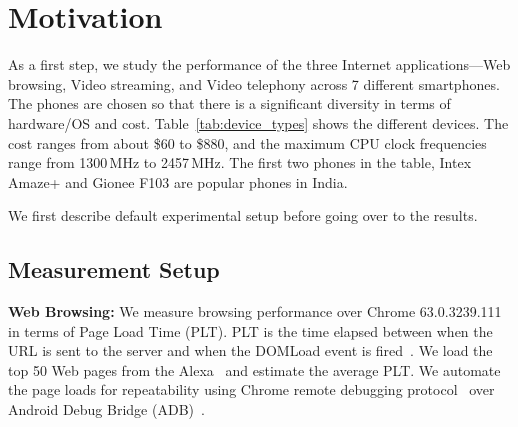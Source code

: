 
\section{Motivation} 
\label{sec:motivation}

As a first step, we study the performance of the three Internet applications---Web browsing, Video streaming, and Video telephony across 7  different smartphones. 
The phones are chosen so that there is a significant
diversity in terms of hardware/OS and cost. Table~\ref{tab:device_types} shows the different devices. The cost ranges from  about \$60 to \$880, and the maximum CPU clock frequencies range from 1300\,MHz to 2457\,MHz. The first two phones in the table, Intex Amaze+ and Gionee F103 are popular phones in India.

We first describe default experimental setup 
before going over to the results.

\subsection{Measurement Setup}
\label{sec:setup}


\noindent\textbf{Web Browsing:} We measure browsing performance over Chrome 63.0.3239.111 in terms of Page Load Time (PLT). 
PLT is the time elapsed between when the URL is sent to the server and when the DOMLoad event is fired~\cite{wang2013demystifying}. We load the top 50 Web pages from the Alexa~\cite{alexa} and estimate the average PLT. We automate the page loads for repeatability using Chrome remote debugging protocol~\cite{ggle} over Android Debug Bridge (ADB)~\cite{adb}.

